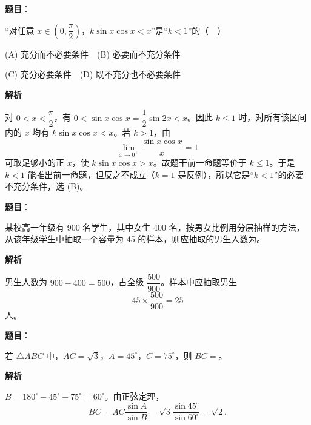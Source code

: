 \begin{answer}

\textbf{题目}：

“对任意 \(x\in(0,\dfrac\pi2)\)，\(k\sin x\cos x<x\)”是“\(k<1\)”的（　）

(A) 充分而不必要条件　(B) 必要而不充分条件

(C) 充分必要条件　(D) 既不充分也不必要条件

\textbf{解析}

对 \(0<x<\dfrac\pi2\)，有 \(0<\sin x\cos x=\dfrac12\sin2x<x\)。因此 \(k\leqslant1\) 时，对所有该区间内的 \(x\) 均有 \(k\sin x\cos x<x\)。若 \(k>1\)，由
\nopagebreak[4]
\[
\lim_{x\to0^+}\frac{\sin x\cos x}{x}=1
\]
可取足够小的正 \(x\)，使 \(k\sin x\cos x>x\)。故题干前一命题等价于 \(k\leqslant1\)。于是 \(k<1\) 能推出前一命题，但反之不成立（\(k=1\) 是反例），所以它是“\(k<1\)”的必要不充分条件，选 (B)。


\end{answer}
\begin{answer}

\textbf{题目}：

某校高一年级有 900 名学生，其中女生 400 名，按男女比例用分层抽样的方法，从该年级学生中抽取一个容量为 45 的样本，则应抽取的男生人数为\gkblank{}。

\textbf{解析}

男生人数为 \(900-400=500\)，占全级 \(\dfrac{500}{900}\)。样本中应抽取男生
\nopagebreak[4]
\[
45\times\frac{500}{900}=25
\]
人。


\end{answer}
\begin{answer}

\textbf{题目}：

若 \(\triangle ABC\) 中，\(AC=\sqrt3\)，\(A=45^\circ\)，\(C=75^\circ\)，则 \(BC=\)\gkblank{}。

\textbf{解析}

\(B=180^\circ-45^\circ-75^\circ=60^\circ\)。由正弦定理，
\nopagebreak[4]
\[
BC=AC\frac{\sin A}{\sin B}
=\sqrt3\frac{\sin45^\circ}{\sin60^\circ}=\sqrt2.
\]


\end{answer}
